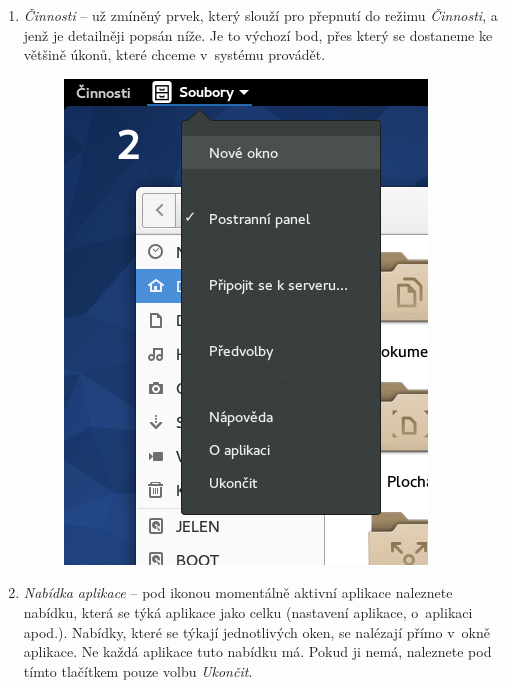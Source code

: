 \begin{enumerate}
\item\emph{Činnosti} -- už zmíněný prvek, který slouží pro přepnutí do režimu \emph{Činnosti}, a jenž je detailněji popsán níže. Je to výchozí bod, přes který se dostaneme ke většině úkonů, které chceme v~systému provádět.

\begin{figure}[t]
\begin{center}
\includegraphics[width=\textwidth]{img/menu-aplikace}
 \label{fig:menu-aplikace}
\end{center}
\end{figure}

\item\emph{Nabídka aplikace} -- pod ikonou momentálně aktivní aplikace naleznete nabídku, která se týká aplikace jako celku (nastavení aplikace, o~aplikaci apod.). Nabídky, které se týkají jednotlivých oken, se nalézají přímo v~okně aplikace. Ne každá aplikace tuto nabídku má. Pokud ji nemá, naleznete pod tímto tlačítkem pouze volbu \emph{Ukončit}.


\end{enumerate}
